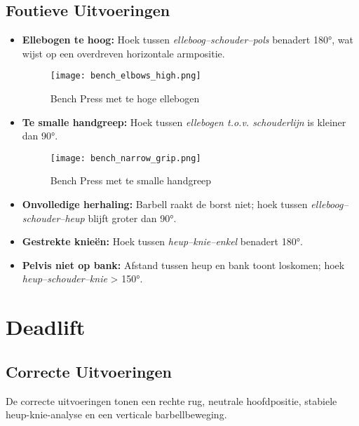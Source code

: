 \subsection{Foutieve Uitvoeringen}
\begin{itemize}
    \item \textbf{Ellebogen te hoog:} Hoek tussen \textit{elleboog–schouder–pols} benadert 180°, wat wijst op een overdreven horizontale armpositie.
    
    \begin{figure}[h]
        \centering
        \texttt{[image: bench\_elbows\_high.png]}
        \caption{Bench Press met te hoge ellebogen}
        \label{fig:bench_elbows_high}
    \end{figure}
    
    \item \textbf{Te smalle handgreep:} Hoek tussen \textit{ellebogen t.o.v. schouderlijn} is kleiner dan 90°.
    
    \begin{figure}[h]
        \centering
        \texttt{[image: bench\_narrow\_grip.png]}
        \caption{Bench Press met te smalle handgreep}
        \label{fig:bench_narrow_grip}
    \end{figure}
    
    \item \textbf{Onvolledige herhaling:} Barbell raakt de borst niet; hoek tussen \textit{elleboog–schouder–heup} blijft groter dan 90°.
    
    \item \textbf{Gestrekte knieën:} Hoek tussen \textit{heup–knie–enkel} benadert 180°.
    
    \item \textbf{Pelvis niet op bank:} Afstand tussen heup en bank toont loskomen; hoek \textit{heup–schouder–knie} > 150°.
\end{itemize}

\section{Deadlift}

\subsection{Correcte Uitvoeringen}
De correcte uitvoeringen tonen een rechte rug, neutrale hoofdpositie, stabiele heup-knie-analyse en een verticale barbellbeweging.

